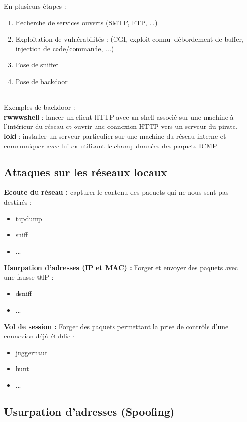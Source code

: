 \documentclass[journal, a4paper]{IEEEtran}
\begin{document}
		En plusieurs étapes :
		\begin{enumerate}
			\item Recherche de services ouverts (SMTP, FTP, ...)
			\item Exploitation de vulnérabilités : (CGI, exploit connu, débordement de buffer, injection de code/commande, ...)
			\item Pose de sniffer
			\item Pose de backdoor
		\end{enumerate}
		~\\
		Exemples de backdoor :\\
		\textbf{rwwwshell} : lancer un client HTTP avec un shell associé sur une machine à l'intérieur du réseau et ouvrir une connexion HTTP vers un serveur du pirate.\\
		\textbf{loki} : installer un serveur particulier sur une machine du réseau interne et communiquer avec lui en utilisant le champ données des paquets ICMP.
		
	\subsection{Attaques sur les réseaux locaux}
		
		\textbf{Ecoute du réseau : }capturer le contenu des paquets qui ne nous sont pas destinés :
		\begin{itemize}
			\item tcpdump
			\item sniff
			\item ...
		\end{itemize}

		\textbf{Usurpation d'adresses (IP et MAC) : }Forger et envoyer des paquets avec une fausse @IP :
		\begin{itemize}
			\item dsniff
			\item ...
		\end{itemize}

		\textbf{Vol de session : }Forger des paquets permettant la prise de contrôle d’une connexion déjà établie :
		\begin{itemize}
			\item juggernaut
			\item hunt
			\item ...
		\end{itemize}

	\subsection{Usurpation d'adresses (Spoofing)}
\end{document}

